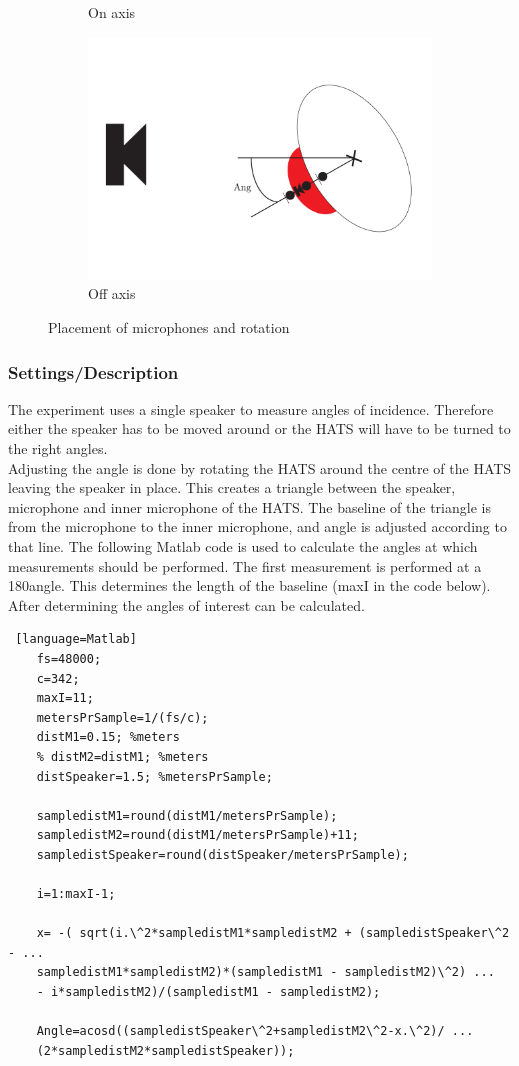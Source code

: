 \begin{figure}[H]
\begin{subfigure}[b]{.4\textwidth}
		\caption{On axis}
		\label{fig:AngOgIndOnax}
		\vspace{2ex}
		\includegraphics[width=\textwidth]{../Journal/Experiments/AngleOfIncidence/AngleOfIncidenceOffAxis.pdf}
		\caption{Off axis}
		\label{fig:AngOgIndOffax}
	\end{subfigure}
	\caption{Placement of microphones and rotation}
\end{figure}


\subsubsection{Settings/Description}
The experiment uses a single speaker to measure angles of incidence. Therefore either the speaker has to be moved around or the HATS will have to be turned to the right angles. \\
Adjusting the angle is done by rotating the HATS around the centre of the HATS leaving the speaker in place. This creates a triangle between the speaker, microphone and inner microphone of the HATS. The baseline of the triangle is from the microphone to the inner microphone, and angle is adjusted according to that line. 
The following Matlab code is used to calculate the angles at which measurements should be performed. The first measurement is performed at a 180\textdegree angle. This determines the length of the baseline (maxI in the code below). After determining the angles of interest can be calculated.  \\
\begin{lstlisting} [language=Matlab]
	fs=48000;
	c=342;
	maxI=11;
	metersPrSample=1/(fs/c);
	distM1=0.15; %meters
	% distM2=distM1; %meters
	distSpeaker=1.5; %metersPrSample;
	
	sampledistM1=round(distM1/metersPrSample);
	sampledistM2=round(distM1/metersPrSample)+11;
	sampledistSpeaker=round(distSpeaker/metersPrSample);
	
	i=1:maxI-1;
	
	x= -( sqrt(i.\^2*sampledistM1*sampledistM2 + (sampledistSpeaker\^2 - ...
	sampledistM1*sampledistM2)*(sampledistM1 - sampledistM2)\^2) ...
	- i*sampledistM2)/(sampledistM1 - sampledistM2);
	
	Angle=acosd((sampledistSpeaker\^2+sampledistM2\^2-x.\^2)/ ...
	(2*sampledistM2*sampledistSpeaker));
\end{lstlisting}

